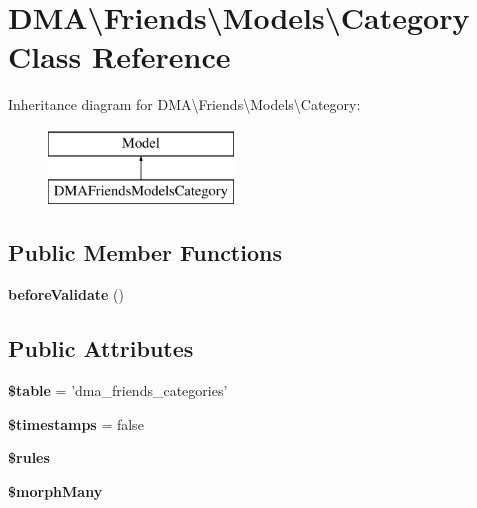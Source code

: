 \hypertarget{classDMA_1_1Friends_1_1Models_1_1Category}{\section{D\+M\+A\textbackslash{}Friends\textbackslash{}Models\textbackslash{}Category Class Reference}
\label{classDMA_1_1Friends_1_1Models_1_1Category}
}
Inheritance diagram for D\+M\+A\textbackslash{}Friends\textbackslash{}Models\textbackslash{}Category\+:\begin{figure}[H]
\begin{center}
\leavevmode
\includegraphics[height=2.000000cm]{de/d78/classDMA_1_1Friends_1_1Models_1_1Category}
\end{center}
\end{figure}
\subsection*{Public Member Functions}
\begin{DoxyCompactItemize}
\item 
\hypertarget{classDMA_1_1Friends_1_1Models_1_1Category_ae8a4b6c28c6f42675844e8e2b30a1f89}{{\bfseries before\+Validate} ()}\label{classDMA_1_1Friends_1_1Models_1_1Category_ae8a4b6c28c6f42675844e8e2b30a1f89}

\end{DoxyCompactItemize}
\subsection*{Public Attributes}
\begin{DoxyCompactItemize}
\item 
\hypertarget{classDMA_1_1Friends_1_1Models_1_1Category_a07d3500cfe462a4db9703ae093158cad}{{\bfseries \$table} = 'dma\+\_\+friends\+\_\+categories'}\label{classDMA_1_1Friends_1_1Models_1_1Category_a07d3500cfe462a4db9703ae093158cad}

\item 
\hypertarget{classDMA_1_1Friends_1_1Models_1_1Category_a2f7a923f3b13a157cc81e2333977584f}{{\bfseries \$timestamps} = false}\label{classDMA_1_1Friends_1_1Models_1_1Category_a2f7a923f3b13a157cc81e2333977584f}

\item 
{\bfseries \$rules}
\item 
{\bfseries \$morph\+Many}
\end{DoxyCompactItemize}
